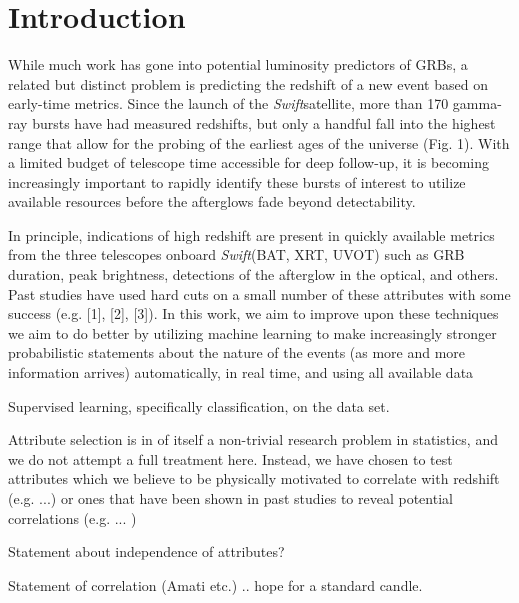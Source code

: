 \documentclass[12pt,preprint]{aastex}
\newcommand{\Swift}{\textit{Swift}}
\begin{document}

\section{Introduction}
\label{sec:intro}

While much work has gone into potential luminosity predictors of GRBs, a 
related but distinct problem is predicting the redshift of a new event based 
on early-time metrics.  Since the launch of the \Swift satellite, more than 170 
gamma-ray bursts have had measured redshifts, but only a handful fall into the 
highest range that allow for the probing of the earliest ages of the universe 
(Fig. 1).  With a limited budget of telescope time accessible for deep 
follow-up, it is becoming increasingly important to rapidly identify these 
bursts of interest to utilize available resources before the afterglows fade 
beyond detectability.

In principle, indications of high redshift are present in quickly available 
metrics from the three telescopes onboard \Swift (BAT, XRT, UVOT) such as GRB 
duration, peak brightness, detections of the afterglow in the optical, and 
others. Past studies have used hard cuts on a small number of these attributes 
with some success (e.g. [1], [2], [3]). In this work, we aim to improve upon 
these techniques we aim to do better by utilizing machine learning to make 
increasingly stronger probabilistic statements about the nature of the events 
(as more and more information arrives) automatically, in real time, and using 
all available data




Supervised learning, specifically classification, on the data set.

Attribute selection is in of itself a non-trivial research problem in 
statistics, and we do not attempt a full treatment here.  Instead, we have 
chosen to test attributes which we believe to be physically motivated to 
correlate with redshift (e.g. ...) or ones that have been shown in past 
studies to reveal potential correlations (e.g. ... )

Statement about independence of attributes?

Statement of correlation (Amati etc.) .. hope for a standard candle.
\end{document}
